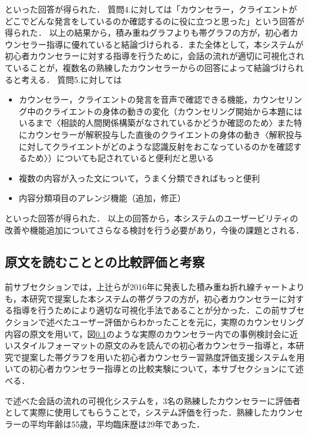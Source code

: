 \documentclass[shuuron]{kuee}
\begin{document}
といった回答が得られた．
質問4.に対しては「カウンセラー，クライエントがどこでどんな発言をしているのか確認するのに役に立つと思った」という回答が得られた．
以上の結果から，積み重ねグラフよりも帯グラフの方が，初心者カウンセラー指導に優れていると結論づけられる．また全体として，本システムが初心者カウンセラーに対する指導を行うために，会話の流れが適切に可視化されていることが，複数名の熟練したカウンセラーからの回答によって結論づけられると考える．
質問5.に対しては

\begin{itemize}

  \item カウンセラー，クライエントの発言を音声で確認できる機能，カウンセリング中のクライエントの身体の動きの変化（カウンセリング開始から本題にはいるまで〈相談的人間関係構築がなされているかどうか確認のため〉また特にカウンセラーが解釈投与した直後のクライエントの身体の動き〈解釈投与に対してクライエントがどのような認識反射をおこなっているのかを確認するため〉）についても記されていると便利だと思いる
  \item 複数の内容が入った文について，うまく分類できればもっと便利
  \item 内容分類項目のアレンジ機能（追加，修正）
\end{itemize}



といった回答が得られた．
以上の回答から，本システムのユーザービリティの改善や機能追加についてさらなる検討を行う必要があり，今後の課題とされる．

\subsection{原文を読むこととの比較評価と考察}%


前サブセクションでは，上辻ら\cite{uetsuji}が2016年に発表した積み重ね折れ線チャートよりも，本研究で提案した本システムの帯グラフの方が，初心者カウンセラーに対する指導を行うためにより適切な可視化手法であることが分かった．この前サブセクションで述べたユーザー評価からわかったことを元に，実際のカウンセリング内容の原文を用いて，図\ref{}のような実際のカウンセラー内での事例検討会に近いスタイルフォーマットの原文のみを読んでの初心者カウンセラー指導と，本研究で提案した帯グラフを用いた初心者カウンセラー習熟度評価支援システムを用いての初心者カウンセラー指導との比較実験について，本サブセクションにて述べる．

で述べた会話の流れの可視化システムを，3名の熟練したカウンセラーに評価者として実際に使用してもらうことで，システム評価を行った．熟練したカウンセラーの平均年齢は55歳，平均臨床歴は29年であった．
\end{document}
